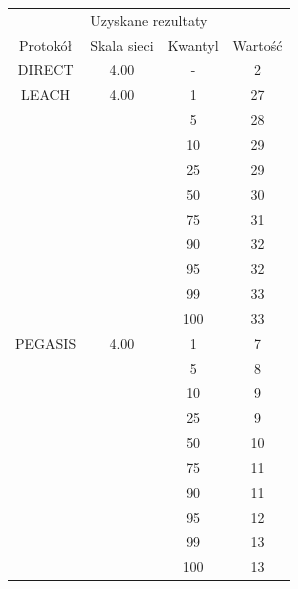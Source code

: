 \documentclass[a4paper,12pt,twoside,openany]{report}
\begin{document}
\begin{longtable}{*{4}{c}}
\toprule
\multicolumn{4}{c}{Uzyskane rezultaty} \\
Protokół	& Skala sieci	& Kwantyl	& Wartość \\
\midrule
\endhead
DIRECT	& 4.00 	& -	& 2 \\*
\midrule
LEACH	& 4.00	& 1	& 27 \\*
	&	& 5	& 28 \\*
	&	& 10	& 29 \\*
	&	& 25	& 29 \\*
	&	& 50	& 30 \\*
	&	& 75	& 31 \\*
	&	& 90	& 32 \\*
	&	& 95	& 32 \\*
	&	& 99	& 33 \\*
	&	& 100	& 33 \\*
\midrule
PEGASIS	& 4.00	& 1	& 7 \\*
	&	& 5	& 8 \\*
	&	& 10	& 9 \\*
	&	& 25	& 9 \\*
	&	& 50	& 10 \\*
	&	& 75	& 11 \\*
	&	& 90	& 11 \\*
	&	& 95	& 12 \\*
	&	& 99	& 13 \\*
	&	& 100	& 13 \\*
\bottomrule
\end{longtable}
\end{document}
